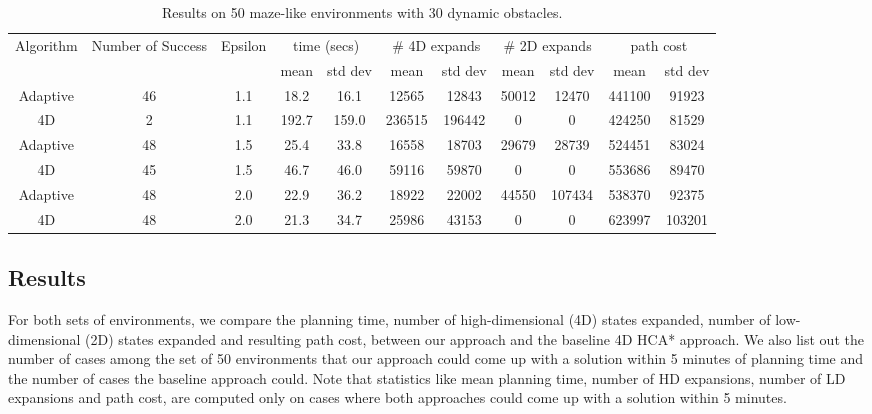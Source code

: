 \begin{table}[t]
\scriptsize
\centering

\begin{tabular}{|c|c|c|c c|c c|c c|c c|}
\hline
Algorithm & Number of Success & Epsilon & \multicolumn{2}{|c|}{time (secs)} & \multicolumn{2}{|c|}{\# 4D expands} & \multicolumn{2}{|c|}{\# 2D expands} & \multicolumn{2}{|c|}{path cost} \\ 
 & & & mean & std dev & mean & std dev & mean & std dev & mean  & std dev \\ \hline\hline
Adaptive & 46 & 1.1 & 18.2 & 16.1 & 12565 & 12843 & 50012 & 12470 & 441100 & 91923 \\
\hline
4D & 2 & 1.1 & 192.7 & 159.0 & 236515 & 196442 & 0 & 0 & 424250 & 81529 \\
\hline\hline
Adaptive & 48 & 1.5 & 25.4 & 33.8 & 16558 & 18703 & 29679 & 28739 & 524451 & 83024 \\
\hline
4D & 45 & 1.5 & 46.7 & 46.0 & 59116 & 59870 & 0 & 0 & 553686 & 89470 \\
\hline\hline
Adaptive & 48 & 2.0 & 22.9 & 36.2 & 18922 & 22002 & 44550 & 107434 & 538370 & 92375 \\
\hline
4D & 48 & 2.0 & 21.3 & 34.7 & 25986 & 43153 & 0 & 0 & 623997 & 103201 \\
\hline
\end{tabular}

\caption{Results on 50 maze-like environments with 30 dynamic obstacles.}
\label{tab:ppad-maze-30}
\end{table}
\subsection{Results}
\label{sec:ppad-results}
For both sets of environments, we compare the planning time, number of high-dimensional (4D) states expanded, number of low-dimensional (2D) states expanded and resulting path cost, between our approach and the baseline 4D HCA* approach. We also list out the number of cases among the set of 50 environments that our approach could come up with a solution within 5 minutes of planning time and the number of cases the baseline approach could. Note that statistics like mean planning time, number of HD expansions, number of LD expansions and path cost, are computed only on cases where both approaches could come up with a solution within 5 minutes.




